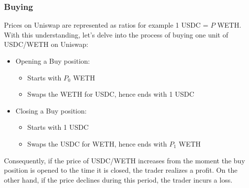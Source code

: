 \subsubsection{Buying}
Prices on Uniswap are represented as ratios for example 1 USDC = $P$ WETH. With this understanding, let's delve into the process of buying one unit of USDC/WETH on Uniswap:
\begin{itemize}
    \item Opening a Buy position:\begin{itemize}
        \item Starts with $P_{0}$ WETH
        \item Swaps the WETH for USDC, hence ends with 1 USDC
    \end{itemize}
    \item Closing a Buy position:\begin{itemize}
        \item Starts with 1 USDC
        \item Swaps the USDC for WETH, hence ends with $P_1$ WETH
    \end{itemize}
\end{itemize}
\noindent Consequently, if the price of USDC/WETH increases from the moment the buy position is opened to the time it is closed, the trader realizes a profit. On the other hand, if the price declines during this period, the trader incurs a loss.

